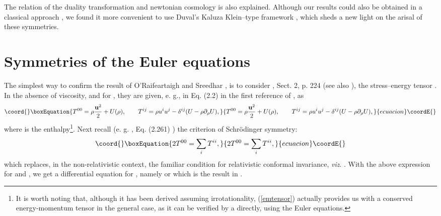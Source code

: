 \documentclass[11pt,a4paper]{article}
\let\ssection=\section
\renewcommand{\section}{\setcounter{equation}{0}\ssection}
\begin{document}
 The relation of the duality transformation
\myHighlight{$\Sigma$}\coordHE{} and newtonian cosmology is also explained.
Although our results could also be obtained in a classical
approach \cite{NH,  RS, BJ},
we found it more convenient to use  Duval's Kaluza
Klein--type framework \cite{DGH}, which sheds a new light
on the arisal of these symmetries.

\section{Symmetries of the Euler equations}

The simplest way to confirm the result of O'Raifeartaigh and
Sreedhar \cite{RS},
is to consider \cite{HH}, Sect. 2, p. 224
(see also \cite{JPRIV}), the stress--energy tensor \coordHE{}.
In the absence of viscosity, \coordHE{}
and for \coordHE{}, they are given, e. g., in Eq. (2.2) in the first
reference of
\cite{JAC}, as
\begin{equation}\coord{}\boxEquation{
	T^{00}=\rho\frac{{\bf u}^2}{2}+U(\rho),
	\qquad
	T^{ij}=\rho u^{i}u^{j}-\delta^{ij}(U-\rho\partial_{\rho}U),
    \label{emtensor}
}{
	T^{00}=\rho\frac{{\bf u}^2}{2}+U(\rho),
	\qquad
	T^{ij}=\rho u^{i}u^{j}-\delta^{ij}(U-\rho\partial_{\rho}U),
    }{ecuacion}\coordE{}\end{equation}
where \coordHE{} is the enthalpy\footnote{It is worth
noting that, although it has been derived assuming irrotationality,
(\ref{emtensor}) actually provides us with a conserved energy-momentum
tensor
in the general case, as it can be verified by a directly,
using the Euler equations.}.
Next recall (e. g.
\cite{JP}, Eq. (2.261) ) the criterion
of Schr\"odinger symmetry:
\begin{equation}\coord{}\boxEquation{
    2T^{00}=\sum_{i}T^{ii},
    \label{nrtracecond}
 }{
    2T^{00}=\sum_{i}T^{ii},
    }{ecuacion}\coordE{}\end{equation}
which replaces, in the non-relativistic context,
the familiar  condition for relativistic conformal
invariance, {\it viz}. \coordHE{}. With the above expression
for \coordHE{} and \coordHE{}, we get
 a differential equation for \coordHE{}, namely
\coordHE{} or
\coordHE{}
which is the result in \cite{RS}.
\end{document}
